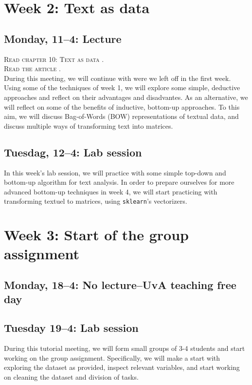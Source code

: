 \section*{Week 2: Text as data}

\subsection*{Monday, 11--4: Lecture}
\textsc{Read chapter 10: Text as data \cite{van2021computational}.} \\
\textsc{Read the article \cite{Boumans2016}.} \\

During this meeting, we will continue with were we left off in the first week. Using some of the techniques of week 1, we will explore some simple, deductive approaches and reflect on their advantages and disadvantes. As an alternative, we will reflect on some of the benefits of inductive, bottom-up approaches. To this aim, we will discuss Bag-of-Words (BOW) representations of textual data, and discuss multiple ways of transforming text into matrices. 

\subsection*{Tuesdag, 12--4: Lab session}
In this week's lab session, we will practice with some simple top-down and bottom-up algorithm for text analysis. In order to prepare ourselves for more advanced bottom-up techniques in week 4, we will start practicing with transforming textuel to matrices, using  \texttt{sklearn}'s vectorizers. 

\section*{Week 3: Start of the group assignment}

\subsection*{Monday, 18--4: No lecture--UvA teaching free day}

\subsection*{Tuesday 19--4: Lab session}
During this tutorial meeting, we will form small groups of 3-4 students and start working on the group assignment. Specifically, we will make a start with exploring the dataset as provided, inspect relevant variables, and start working on cleaning the dataset and division of tasks. 

